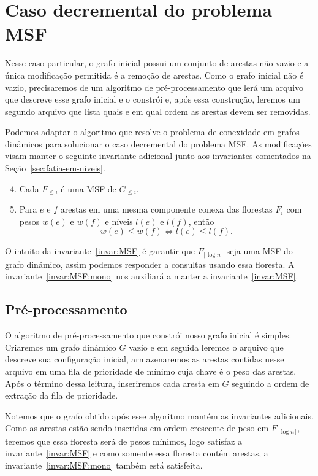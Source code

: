 \chapter{Caso decremental do problema MSF}

Nesse caso particular, o grafo inicial possui um conjunto de arestas não vazio e a única modificação permitida é a remoção de arestas. Como o grafo inicial não é vazio, precisaremos de um algoritmo de pré-processamento que lerá um arquivo que descreve esse grafo inicial e o constrói e, após essa construção, leremos um segundo arquivo que lista quais e em qual ordem as arestas devem ser removidas.

Podemos adaptar o algoritmo \HDT{} que resolve o problema de conexidade em grafos dinâmicos para solucionar o caso decremental do problema MSF.
As modificações visam manter o seguinte invariante adicional junto aos invariantes comentados na Seção~\ref{sec:fatia-em-niveis}.
\begin{enumerate}[label=(\roman*)]
    \setcounter{enumi}{3}
    \item Cada $F_{\leqslant i}$ é uma MSF de $G_{\leqslant i}$.\label{invar:MSF}
    \item Para $e$ e $f$ arestas em uma mesma componente conexa das florestas $F_i$ com pesos $w(e)$ e $w(f)$ e níveis $l(e)$ e $l(f)$, então\label{invar:MSF:mono}
	    $$w(e) \leq w(f) \iff l(e) \leq l(f).$$
\end{enumerate}

O intuito da invariante~\ref{invar:MSF} é garantir que $F_{\lceil \log n \rceil}$ seja uma MSF do grafo dinâmico, assim podemos responder a consultas usando essa floresta. A invariante~\ref{invar:MSF:mono} nos auxiliará a manter a invariante~\ref{invar:MSF}.

\section{Pré-processamento}


O algoritmo de pré-processamento que constrói nosso grafo inicial é simples.
Criaremos um grafo dinâmico $G$ vazio e em seguida leremos o arquivo que descreve sua configuração inicial, armazenaremos as arestas contidas nesse arquivo em uma fila de prioridade de mínimo cuja chave é o peso das arestas. 
Após o término dessa leitura, inseriremos cada aresta em $G$ seguindo a ordem de extração da fila de prioridade.

Notemos que o grafo obtido após esse algoritmo mantém as invariantes adicionais. Como as arestas estão sendo inseridas em ordem crescente de peso em $F_{\lceil \log n \rceil}$, teremos que essa floresta será de pesos mínimos, logo satisfaz a invariante~\ref{invar:MSF} e como somente essa floresta contém arestas, a invariante~\ref{invar:MSF:mono} também está satisfeita.


